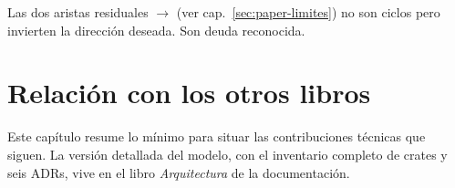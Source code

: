 Las dos aristas residuales $\to$ (ver
cap.~\ref{sec:paper-limites}) no son ciclos pero invierten la
dirección deseada. Son deuda reconocida.

\section{Relación con los otros libros}

Este capítulo resume lo mínimo para situar las contribuciones
técnicas que siguen. La versión detallada del modelo, con el
inventario completo de crates y seis ADRs, vive en el libro
\emph{Arquitectura} de la documentación.
